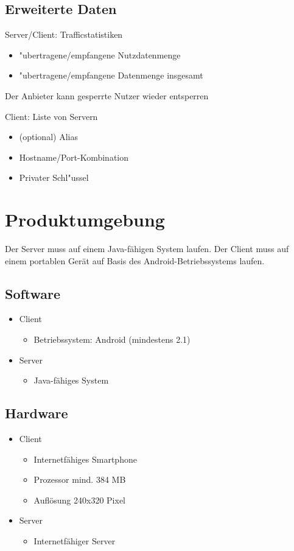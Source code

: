 \documentclass[a4paper,10pt]{scrartcl}
\begin{document}
\subsection{Erweiterte Daten}
\begin{usecase}
 {Server/Client: Trafficstatistiken
   \begin{itemize}
   \item "ubertragene/empfangene Nutzdatenmenge
   \item "ubertragene/empfangene Datenmenge insgesamt
   \end{itemize}
}
 {Der Anbieter kann gesperrte Nutzer wieder entsperren


}
 {Client: Liste von Servern
   \begin{itemize}
   \item (optional) Alias
   \item Hostname/Port-Kombination
   \item Privater Schl"ussel
   \end{itemize}
}
\end{usecase}

\section{Produktumgebung}
Der Server muss auf einem Java-fähigen System laufen.
Der Client muss auf einem portablen Gerät auf Basis des Android-Betriebssystems laufen.
\subsection{Software}
\begin{itemize}
\item Client
   \begin{itemize}
      \item Betriebssystem: Android (mindestens 2.1)
   \end{itemize}
\item Server
   \begin{itemize}
      \item Java-fähiges System
   \end{itemize}
\end{itemize}

\subsection{Hardware}
\begin{itemize}
\item Client
   \begin{itemize}
      \item Internetfähiges Smartphone
      \item Prozessor mind. 384 MB
      \item Auflösung 240x320 Pixel
   \end{itemize}
\item Server
   \begin{itemize}
      \item Internetfähiger Server
   \end{itemize}
\end{itemize}
\end{document}

